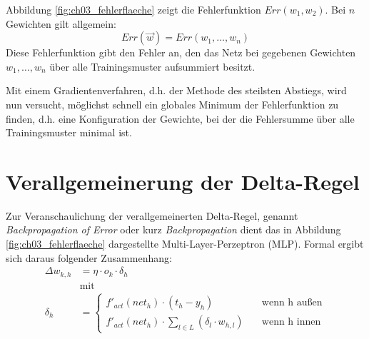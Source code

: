 Abbildung \ref{fig:ch03_fehlerflaeche} zeigt die Fehlerfunktion $Err(w_1, w_2)$. Bei $n$ Gewichten gilt allgemein:
\[
	Err(\vec{w}) = Err(w_1, \ldots, w_n)
\]
Diese Fehlerfunktion gibt den Fehler an, den das Netz bei gegebenen Gewichten $w_1, \ldots, w_n$ über alle Trainingsmuster aufsummiert besitzt.

Mit einem Gradientenverfahren, d.h. der Methode des steilsten Abstiegs, wird nun versucht, möglichst schnell ein globales Minimum der Fehlerfunktion zu finden, d.h. eine Konfiguration der Gewichte, bei der die Fehlersumme über alle Trainingsmuster minimal ist.



\section*{Verallgemeinerung der Delta-Regel}
Zur Veranschaulichung der verallgemeinerten Delta-Regel, genannt \emph{Backpropagation of Error} oder kurz \emph{Backpropagation} dient das in Abbildung \ref{fig:ch03_fehlerflaeche} dargestellte Multi-Layer-Perzeptron (MLP).
Formal ergibt sich daraus folgender Zusammenhang:
\begin{align*}
	\Delta w_{k,h} &= \eta \cdot o_k \cdot \delta_h \\
	&\text{mit} \\
	\delta_h &=
	\begin{cases}
		f'_{act}(net_h) \cdot (t_h - y_h) 
		\quad &\text{wenn h außen} \\
		f'_{act}(net_h) \cdot \sum_{l \in L} (\delta_l \cdot w_{h,l})
		\quad &\text{wenn h innen}
	\end{cases}
\end{align*}

